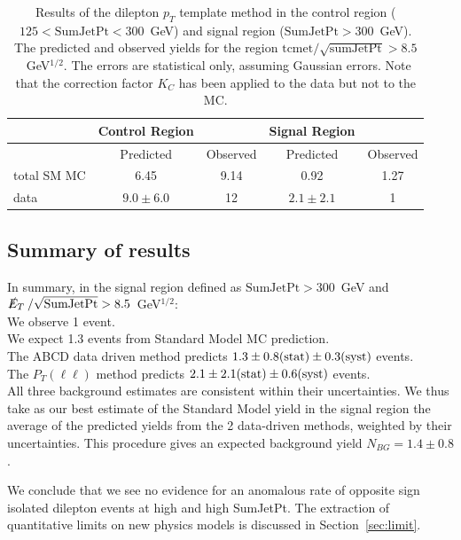 \begin{table}[hbt]
\begin{center}
\caption{\label{tab:victory}Results of the dilepton $p_{T}$ template method in the control region
($125 < \mathrm{SumJetPt} < 300$~GeV) and signal region ($\mathrm{SumJetPt} > 300$~GeV). The predicted and 
observed yields for the region $\mathrm{tcmet}/\sqrt{\mathrm{sumJetPt}} > 8.5$~GeV$^{1/2}$. The errors are
statistical only, assuming Gaussian errors. Note that the correction factor $K_C$ has been applied to
the data but not to the MC.  }
\begin{tabular}{l|cc|cc}
\hline
              &    Control Region   &                        &   Signal Region    &               \\
\hline
              & Predicted           &   Observed             &   Predicted        &  Observed     \\              
\hline
total SM   MC &      6.45           &       9.14             &   0.92             &  1.27         \\
         data &  $9.0 \pm 6.0$      &         12             &   $2.1 \pm 2.1$    &  1            \\
\hline
\end{tabular}
\end{center}
\end{table}



\subsection{Summary of results}

In summary, in the signal region defined as $\mathrm{SumJetPt}>300$~GeV and $\met/\sqrt{\rm SumJetPt} > 8.5$~GeV$^{1/2}$:\\ 
We observe 1 event. \\
We expect 1.3 events from Standard Model MC prediction. \\
The ABCD data driven method predicts $1.3 \pm 0.8({\rm stat}) \pm 0.3({\rm syst})$ events. \\
The  $P_T(\ell\ell)$ method predicts $2.1 \pm 2.1({\rm stat}) \pm 0.6({\rm syst})$ events. \\
  
All three background estimates are consistent within their uncertainties.
We thus take as our best estimate of the Standard Model yield in 
the signal region the average of the predicted yields from the 2 data-driven methods, 
weighted by their uncertainties.
This procedure gives an expected background yield $N_{BG}=1.4 \pm 0.8$.

We conclude that we see no evidence for an anomalous 
rate of opposite sign isolated dilepton events
at high \met and high SumJetPt.  The extraction of 
quantitative limits on new physics models is discussed
in Section~\ref{sec:limit}.